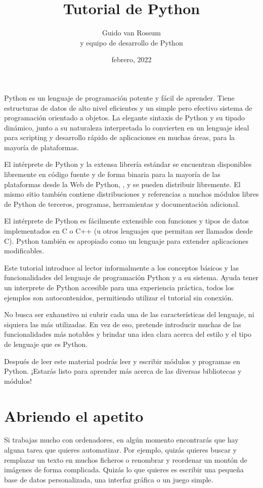 \documentclass[a5paper,10pt,spanish]{sphinxmanual}
\title{Tutorial de Python}
\date{febrero, 2022}
\author{Guido van Rossum\\y equipo de desarrollo de Python}
\begin{document}
\pagestyle{empty}
\sphinxmaketitle
\pagestyle{plain}
\sphinxtableofcontents
\pagestyle{normal}
\label{\detokenize{tutorial/index::doc}}


\sphinxAtStartPar
Python es un lenguaje de programación potente y fácil de aprender. Tiene estructuras de datos de alto nivel eficientes y un simple pero efectivo sistema de programación orientado a objetos. La elegante sintaxis de Python y su tipado dinámico, junto a su naturaleza interpretada lo convierten en un lenguaje ideal para scripting y desarrollo rápido de aplicaciones en muchas áreas, para la mayoría de plataformas.

\sphinxAtStartPar
El intérprete de Python y la extensa librería estándar se encuentran disponibles libremente en código fuente y de forma binaria para la mayoría de las plataformas desde la Web de Python, , y se pueden distribuir libremente. El mismo sitio también contiene distribuciones y referencias a muchos módulos libres de Python de terceros, programas, herramientas y documentación adicional.

\sphinxAtStartPar
El intérprete de Python es fácilmente extensible con funciones y tipos de datos implementados en C o C++ (u otros lenguajes que permitan ser llamados desde C). Python también es apropiado como un lenguaje para extender aplicaciones modificables.

\sphinxAtStartPar
Este tutorial introduce al lector informalmente a los conceptos básicos y las funcionalidades del lenguaje de programación Python y a su sistema. Ayuda tener un interprete de Python accesible para una experiencia práctica, todos los ejemplos son auto\sphinxhyphen{}contenidos, permitiendo utilizar el tutorial sin conexión.

\sphinxAtStartPar
No busca ser exhaustivo ni cubrir cada una de las características del lenguaje, ni siquiera las más utilizadas. En vez de eso, pretende introducir muchas de las funcionalidades más notables y brindar una idea clara acerca del estilo y el tipo de lenguaje que es Python. 

\sphinxAtStartPar
Después de leer este material podrás leer y escribir módulos y programas en Python. ¡Estarás listo para aprender más acerca de las diversas bibliotecas y módulos!


\chapter{Abriendo el apetito}
\label{\detokenize{tutorial/appetite:whetting-your-appetite}}\label{\detokenize{tutorial/appetite:tut-intro}}\label{\detokenize{tutorial/appetite::doc}}
\sphinxAtStartPar
Si trabajas mucho con ordenadores, en algún momento encontrarás que hay alguna tarea que quieres automatizar. Por ejemplo, quizás quieres buscar y remplazar un texto en muchos ficheros o renombrar y reordenar un montón de imágenes de forma complicada. Quizás lo que quieres es escribir una pequeña base de datos personalizada, una interfaz gráfica o un juego simple.
\end{document}
